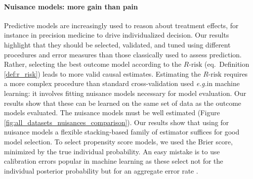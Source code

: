 \documentclass[a4paper,num-refs]{oup-contemporary}%
\newcommand{\eg}{\emph{e.g.}}
\begin{document}
\paragraph{Nuisance models: more gain than pain}
%
Predictive models are increasingly used to reason about treatment effects, for
instance in precision medicine to drive individualized decision. Our results
highlight that they should be selected, validated, and tuned using different
procedures and error measures than those classically used to assess prediction. Rather, selecting the best outcome
model according to the $R\text{-risk}$ (eq.\, Definition \ref{def:r_risk}) leads
to more valid causal estimates. Estimating the $R\text{-risk}$ requires a more
complex procedure than standard cross-validation used \eg in machine
learning: it involves fitting nuisance models necessary for model
evaluation.
Our results show that these can be learned on the same set of data as the
outcome models evaluated. The nuisance models must be well estimated (Figure
\ref{fig:all_datasets_nuisances_comparison}). Our results show that using for
nuisance models a flexible stacking-based family of estimator suffices for good
model selection. To select propensity score models, we used the Brier score,
minimized by the true individual probability. An easy mistake is to
use calibration errors popular in machine learning
\cite{platt_probabilistic_1999,zadrozny_obtaining_2001,niculescu-mizil_predicting_2005,minderer_revisiting_2021}
as these select not for the individual posterior probability but for an
aggregate error rate \cite{perez2022beyond}.


%
\end{document}
